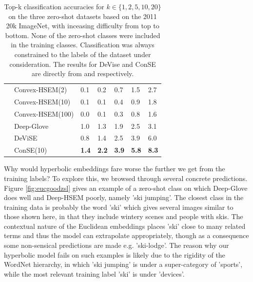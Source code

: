 \documentclass[12pt]{report}
\begin{document}
\begin{table}[]
\begin{tabular}{cllllll}
  \multicolumn{1}{l}{} & Convex-HSEM(2) & 0.1 & 0.2 & 0.7 & 1.5 & 2.7 \\
  \multicolumn{1}{l}{} & Convex-HSEM(10) & 0.1 & 0.1 & 0.4 & 0.9 & 1.8 \\
  \multicolumn{1}{l}{} & Convex-HSEM(100) & 0.0 & 0.1 & 0.3 & 0.8 & 1.6 \\
  \multicolumn{1}{l}{} & Deep-Glove & 1.0 & 1.3  & 1.9 & 2.5 & 3.1 \\
  \multicolumn{1}{l}{} & DeViSE & 0.8 & 1.4 & 2.5 & 3.9 & 6.0 \\
  \multicolumn{1}{l}{} & ConSE(10) & \textbf{1.4} & \textbf{2.2} & \textbf{3.9} & \textbf{5.8} & \textbf{8.3} \\ \hline
\end{tabular}
\caption{Top-k classification accuracies for $k \in \{1, 2, 5, 10, 20 \}$ on the three zero-shot datasets based on the 2011 20k ImageNet, with inceasing difficulty from top to bottom. None of the zero-shot classes were included in the training classes. Classification was always constrained to the labels of the dataset under consideration. The results for DeVise and ConSE are directly from \cite{Frome2013} and \cite{Norouzi2013} respectively.}
\label{tbl:zslres}
\end{table}

Why would hyperbolic embeddings fare worse the further we get from the training labels? To explore this, we browsed through several concrete predictions. Figure \ref{fig:eucgoodzsl} gives an example of a zero-shot class on which Deep-Glove does well and Deep-HSEM poorly, namely 'ski jumping'. The closest class in the training data is probably the word 'ski' which gives several images similar to those shown here, in that they include wintery scenes and people with skis. The contextual nature of the Euclidean embeddings places 'ski' close to many related terms and thus the model can extrapolate appropriately, though as a consequence some non-sensical predictions are made e.g. 'ski-lodge'. The reason why our hyperbolic model fails on such examples is likely due to the rigidity of the WordNet hierarchy, in which 'ski jumping' is under a super-category of 'sports', while the most relevant training label 'ski' is under 'devices'. 
\end{document}
